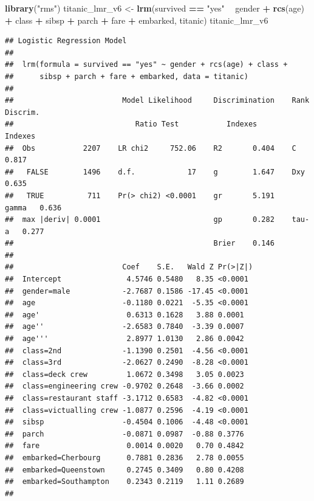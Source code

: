 \documentclass[12pt,]{krantz}
\newenvironment{Shaded}{\begin{snugshade}}{\end{snugshade}}
\newcommand{\KeywordTok}[1]{\textcolor[rgb]{0.13,0.29,0.53}{\textbf{#1}}}
\newcommand{\NormalTok}[1]{#1}
\newcommand{\OperatorTok}[1]{\textcolor[rgb]{0.81,0.36,0.00}{\textbf{#1}}}
\newcommand{\StringTok}[1]{\textcolor[rgb]{0.31,0.60,0.02}{#1}}
\theoremstyle{definition}
\theoremstyle{definition}
\theoremstyle{definition}
\theoremstyle{remark}
\begin{document}
\begin{Shaded}
\begin{Highlighting}[]
\KeywordTok{library}\NormalTok{(}\StringTok{"rms"}\NormalTok{)}
\NormalTok{titanic_lmr_v6 <-}\StringTok{ }\KeywordTok{lrm}\NormalTok{(survived }\OperatorTok{==}\StringTok{ "yes"} \OperatorTok{~}\StringTok{ }\NormalTok{gender }\OperatorTok{+}\StringTok{ }\KeywordTok{rcs}\NormalTok{(age) }\OperatorTok{+}\StringTok{ }\NormalTok{class }\OperatorTok{+}\StringTok{ }\NormalTok{sibsp }\OperatorTok{+}
\StringTok{                   }\NormalTok{parch }\OperatorTok{+}\StringTok{ }\NormalTok{fare }\OperatorTok{+}\StringTok{ }\NormalTok{embarked, titanic)}
\NormalTok{titanic_lmr_v6}
\end{Highlighting}
\end{Shaded}

\begin{verbatim}
## Logistic Regression Model
##  
##  lrm(formula = survived == "yes" ~ gender + rcs(age) + class + 
##      sibsp + parch + fare + embarked, data = titanic)
##  
##                         Model Likelihood     Discrimination    Rank Discrim.    
##                            Ratio Test           Indexes           Indexes       
##  Obs           2207    LR chi2     752.06    R2       0.404    C       0.817    
##   FALSE        1496    d.f.            17    g        1.647    Dxy     0.635    
##   TRUE          711    Pr(> chi2) <0.0001    gr       5.191    gamma   0.636    
##  max |deriv| 0.0001                          gp       0.282    tau-a   0.277    
##                                              Brier    0.146                     
##  
##                         Coef    S.E.   Wald Z Pr(>|Z|)
##  Intercept               4.5746 0.5480   8.35 <0.0001 
##  gender=male            -2.7687 0.1586 -17.45 <0.0001 
##  age                    -0.1180 0.0221  -5.35 <0.0001 
##  age'                    0.6313 0.1628   3.88 0.0001  
##  age''                  -2.6583 0.7840  -3.39 0.0007  
##  age'''                  2.8977 1.0130   2.86 0.0042  
##  class=2nd              -1.1390 0.2501  -4.56 <0.0001 
##  class=3rd              -2.0627 0.2490  -8.28 <0.0001 
##  class=deck crew         1.0672 0.3498   3.05 0.0023  
##  class=engineering crew -0.9702 0.2648  -3.66 0.0002  
##  class=restaurant staff -3.1712 0.6583  -4.82 <0.0001 
##  class=victualling crew -1.0877 0.2596  -4.19 <0.0001 
##  sibsp                  -0.4504 0.1006  -4.48 <0.0001 
##  parch                  -0.0871 0.0987  -0.88 0.3776  
##  fare                    0.0014 0.0020   0.70 0.4842  
##  embarked=Cherbourg      0.7881 0.2836   2.78 0.0055  
##  embarked=Queenstown     0.2745 0.3409   0.80 0.4208  
##  embarked=Southampton    0.2343 0.2119   1.11 0.2689  
## 
\end{verbatim}
\end{document}

